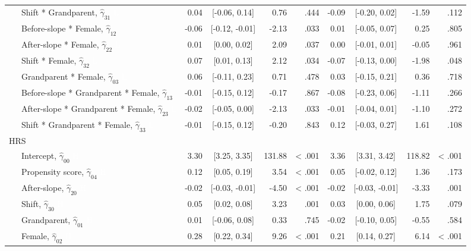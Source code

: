 \documentclass[
  english,
  man, noextraspace]{apa7}
\newenvironment{lltable}{\begin{landscape}\begin{center}\begin{ThreePartTable}}{\end{ThreePartTable}\end{center}\end{landscape}}
\begin{document}
\begin{appendix}
\begin{lltable}
{\begin{longtable}{lrcrrrcrr}
\ \ \ Shift * Grandparent, $\hat{\gamma}_{31}$ \textcolor{white}{L} & 0.04 & [-0.06, 0.14] & 0.76 & .444 & -0.09 & [-0.20, 0.02] & -1.59 & .112\\
\ \ \ Before-slope * Female, $\hat{\gamma}_{12}$ & -0.06 & [-0.12, -0.01] & -2.13 & .033 & 0.01 & [-0.05, 0.07] & 0.25 & .805\\
\ \ \ After-slope * Female, $\hat{\gamma}_{22}$ \textcolor{white}{L} & 0.01 & [0.00, 0.02] & 2.09 & .037 & 0.00 & [-0.01, 0.01] & -0.05 & .961\\
\ \ \ Shift * Female, $\hat{\gamma}_{32}$ \textcolor{white}{L} & 0.07 & [0.01, 0.13] & 2.12 & .034 & -0.07 & [-0.13, 0.00] & -1.98 & .048\\
\ \ \ Grandparent * Female, $\hat{\gamma}_{03}$ \textcolor{white}{L} & 0.06 & [-0.11, 0.23] & 0.71 & .478 & 0.03 & [-0.15, 0.21] & 0.36 & .718\\
\ \ \ Before-slope * Grandparent * Female, $\hat{\gamma}_{13}$ & -0.01 & [-0.15, 0.12] & -0.17 & .867 & -0.08 & [-0.23, 0.06] & -1.11 & .266\\
\ \ \ After-slope * Grandparent * Female, $\hat{\gamma}_{23}$ \textcolor{white}{L} & -0.02 & [-0.05, 0.00] & -2.13 & .033 & -0.01 & [-0.04, 0.01] & -1.10 & .272\\
\ \ \ Shift * Grandparent * Female, $\hat{\gamma}_{33}$ \textcolor{white}{L} & -0.01 & [-0.15, 0.12] & -0.20 & .843 & 0.12 & [-0.03, 0.27] & 1.61 & .108\\
HRS &  &  &  &  &  &  &  & \\
\ \ \ Intercept, $\hat{\gamma}_{00}$ \textcolor{white}{H} & 3.30 & [3.25, 3.35] & 131.88 & < .001 & 3.36 & [3.31, 3.42] & 118.82 & < .001\\
\ \ \ Propensity score, $\hat{\gamma}_{04}$ \textcolor{white}{H} & 0.12 & [0.05, 0.19] & 3.54 & < .001 & 0.05 & [-0.02, 0.12] & 1.36 & .173\\
\ \ \ After-slope, $\hat{\gamma}_{20}$ \textcolor{white}{H} & -0.02 & [-0.03, -0.01] & -4.50 & < .001 & -0.02 & [-0.03, -0.01] & -3.33 & .001\\
\ \ \ Shift, $\hat{\gamma}_{30}$ \textcolor{white}{H} & 0.05 & [0.02, 0.08] & 3.23 & .001 & 0.03 & [0.00, 0.06] & 1.75 & .079\\
\ \ \ Grandparent, $\hat{\gamma}_{01}$ \textcolor{white}{H} & 0.01 & [-0.06, 0.08] & 0.33 & .745 & -0.02 & [-0.10, 0.05] & -0.55 & .584\\
\ \ \ Female, $\hat{\gamma}_{02}$ \textcolor{white}{H} & 0.28 & [0.22, 0.34] & 9.26 & < .001 & 0.21 & [0.14, 0.27] & 6.14 & < .001\\

\end{longtable}}
\end{lltable}
\end{appendix}
\end{document}
